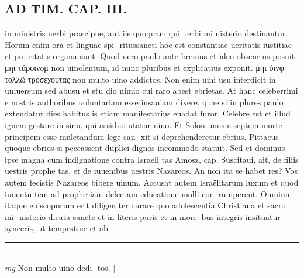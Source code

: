 \documentclass{article}
\begin{document}
\begin{pages}
\section*{AD TIM. CAP. III. }
\marginpar{[ p.131 ]}\pstart in ministris uerbi praecipue, aut iis quoquam qui uerbi mi nisterio destinantur. Horum enim ora et linguae spi- ritussancti hoc est constantiae ueritatis iustitiae et pu- ritatis organa sunt. Quod uero paulo ante breuius et ideo obscurius posuit μηι τάροινoμ non uinolentum, id nunc pluribus et explicatius exponit. μηι ὁινφ τολλῶ τροσέχουτας non multo uino addictos. Non enim uini usu interdicit in uniuersum sed abusu et stu dio nimio cui raro abest ebrietas. At hanc celeberrimi e nostris authoribus uoluntariam esse insaniam dixere, quae si in plures paulo extendatur dies habitus is etiam manifestarius euadat furor. Celebre est et illud ignem gestare in sinu, qui assiduo utatur uiuo. Et Solon unus e septem morte principem esse mulctandum lege san- xit si deprehenderetur ebrius. Pittacus quoque ebrios si peccassent duplici dignos incommodo statuit. Sed et dominus ipse magna cum indignatione contra Israeli tas Amosz, cap. Suscitaui, ait, de filiis uestris prophe tas, et de iuuenibus uestris Nazareos. An non ita se habet res? Vos autem fecistis Nazareos bibere uinum. Accusat autem Israëlitarum luxum et quod iuuentu tem ad prophetiam delectam educatione molli cor- rumperent. Omnium itaque episcoporum erit diligen ter curare quo adolescentia Christiana et sacro mi- nisterio dicata sancte et in literis puris et in mori- bus integris insituatur synceris, ut tempestiue et ab  \pend
\vspace{0.5cm}\noindent
\vspace{0.2cm}\rule{1cm}{0.2pt}\\ 
\hspace{0.2cm}\textit{mg}
\footnotesize Non multo uino dedi- tos. 
\normalsize| 

\end{pages}
\end{document}
